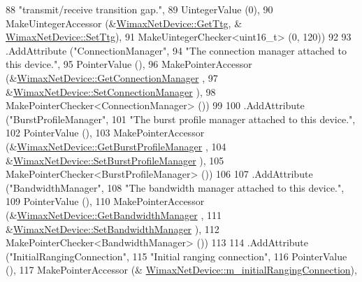 \begin{DoxyCode}
88                    \textcolor{stringliteral}{"transmit/receive transition gap."},
89                    UintegerValue (0),
90                    MakeUintegerAccessor (&\hyperlink{classns3_1_1WimaxNetDevice_a229b824a5959b3231ac6edf6d3c01ab6}{WimaxNetDevice::GetTtg}, &
      \hyperlink{classns3_1_1WimaxNetDevice_aa6b912e871343b31c16d8897abc77565}{WimaxNetDevice::SetTtg}),
91                    MakeUintegerChecker<uint16\_t> (0, 120))
92 
93     .AddAttribute (\textcolor{stringliteral}{"ConnectionManager"},
94                    \textcolor{stringliteral}{"The connection manager attached to this device."},
95                    PointerValue (),
96                    MakePointerAccessor (&\hyperlink{classns3_1_1WimaxNetDevice_a25450b18f62f91e4c2ab08485bd171a2}{WimaxNetDevice::GetConnectionManager}
      ,
97                                         &\hyperlink{classns3_1_1WimaxNetDevice_a10695f2de6789f2e66f54436eeb5f97b}{WimaxNetDevice::SetConnectionManager}
      ),
98                    MakePointerChecker<ConnectionManager> ())
99 
100     .AddAttribute (\textcolor{stringliteral}{"BurstProfileManager"},
101                    \textcolor{stringliteral}{"The burst profile manager attached to this device."},
102                    PointerValue (),
103                    MakePointerAccessor (&\hyperlink{classns3_1_1WimaxNetDevice_adc0798ce5d154658179fcecaf5bc602f}{WimaxNetDevice::GetBurstProfileManager}
      ,
104                                         &\hyperlink{classns3_1_1WimaxNetDevice_a67cfa6569ece6ba94e169ad0c3eb8616}{WimaxNetDevice::SetBurstProfileManager}
      ),
105                    MakePointerChecker<BurstProfileManager> ())
106 
107     .AddAttribute (\textcolor{stringliteral}{"BandwidthManager"},
108                    \textcolor{stringliteral}{"The bandwidth manager attached to this device."},
109                    PointerValue (),
110                    MakePointerAccessor (&\hyperlink{classns3_1_1WimaxNetDevice_ae5b92eaa51e409609c2ac362894af454}{WimaxNetDevice::GetBandwidthManager}
      ,
111                                         &\hyperlink{classns3_1_1WimaxNetDevice_a7c96f4dc3cd90594153978d4f917f50e}{WimaxNetDevice::SetBandwidthManager}
      ),
112                    MakePointerChecker<BandwidthManager> ())
113 
114     .AddAttribute (\textcolor{stringliteral}{"InitialRangingConnection"},
115                    \textcolor{stringliteral}{"Initial ranging connection"},
116                    PointerValue (),
117                    MakePointerAccessor (&
      \hyperlink{classns3_1_1WimaxNetDevice_a2bcfecf3dcc39a5953561c544358e84d}{WimaxNetDevice::m\_initialRangingConnection}),

\end{DoxyCode}
